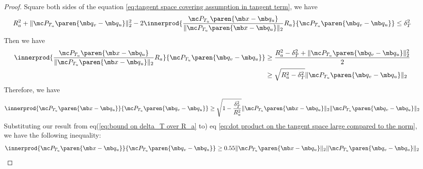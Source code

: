 \begin{proof}
Square both sides of the equation \eqref{eq:tangent space covering assumption in tangent term}, we have
\begin{equation}
    R_a^2 + \| \mc P_{T_u} \paren{\mb q_v - \mb q_u }\|_2^2 - 2 \innerprod{\frac{\mc P_{T_u} \paren{\mb x - \mb q_u}}{\| \mc P_{T_u} \paren{\mb x - \mb q_u}\|_2} R_a}{\mc P_{T_u} \paren{\mb q_v - \mb q_u}} \leq \delta_T^2
\end{equation}
Then we have
\begin{equation}
    \begin{aligned}
        \innerprod{\frac{\mc P_{T_u} \paren{\mb x - \mb q_u}}{\| \mc P_{T_u} \paren{\mb x - \mb q_u}\|_2} R_a}{\mc P_{T_u} \paren{\mb q_v - \mb q_u}}
        &\geq \frac{R_a^2 - \delta_T^2 + \| \mc P_{T_u} \paren{\mb q_v - \mb q_u }\|_2^2}{2}\\
        &\geq \sqrt{R_a^2 - \delta_T^2} \| \mc P_{T_u} \paren{\mb q_v - \mb q_u }\|_2
    \end{aligned}
\end{equation}
Therefore, we have
\begin{equation}
\label{eq:dot product on the tangent space large compared to the norm}
    \begin{aligned}
         \innerprod{\mc P_{T_u} \paren{\mb x - \mb q_u}}{\mc P_{T_u} \paren{\mb q_v - \mb q_u}} 
        \geq \sqrt{1 - \frac{\delta_T^2}{R_a^2}}
        \| \mc P_{T_u} \paren{\mb x - \mb q_u }\|_2
        \| \mc P_{T_u} \paren{\mb q_v - \mb q_u }\|_2
    \end{aligned}
\end{equation}
Substituting our result from eq(\ref{eq:bound on delta_T over R_a} to) eq \eqref{eq:dot product on the tangent space large compared to the norm}, we have the following inequality:
\begin{equation}
     \innerprod{\mc P_{T_u} \paren{\mb x - \mb q_u}}{\mc P_{T_u} \paren{\mb q_v - \mb q_u}} 
    \geq 0.55
    \| \mc P_{T_u} \paren{\mb x - \mb q_u }\|_2
    \| \mc P_{T_u} \paren{\mb q_v - \mb q_u }\|_2
\end{equation}
\end{proof}

